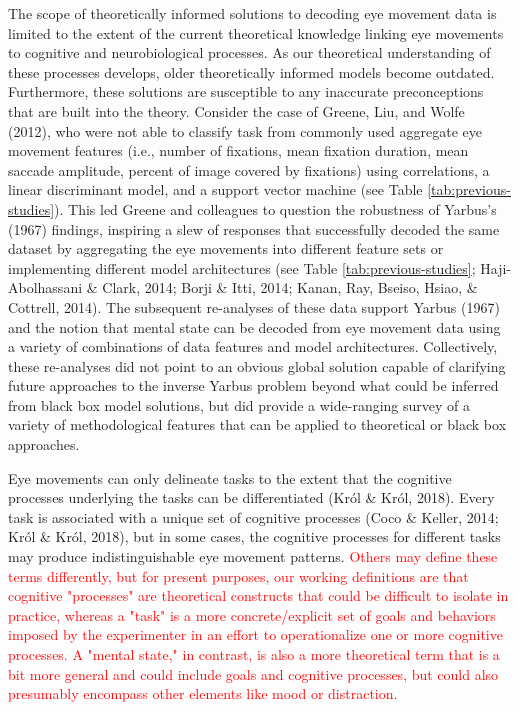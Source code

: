 \documentclass[
  english,
  man, donotrepeattitle,floatsintext]{apa6}
\begin{document}
The scope of theoretically informed solutions to decoding eye movement data is limited to the extent of the current theoretical knowledge linking eye movements to cognitive and neurobiological processes. As our theoretical understanding of these processes develops, older theoretically informed models become outdated. Furthermore, these solutions are susceptible to any inaccurate preconceptions that are built into the theory. Consider the case of Greene, Liu, and Wolfe (2012), who were not able to classify task from commonly used aggregate eye movement features (i.e., number of fixations, mean fixation duration, mean saccade amplitude, percent of image covered by fixations) using correlations, a linear discriminant model, and a support vector machine (see Table \ref{tab:previous-studies}). This led Greene and colleagues to question the robustness of Yarbus's (1967) findings, inspiring a slew of responses that successfully decoded the same dataset by aggregating the eye movements into different feature sets or implementing different model architectures (see Table \ref{tab:previous-studies}; Haji-Abolhassani \& Clark, 2014; Borji \& Itti, 2014; Kanan, Ray, Bseiso, Hsiao, \& Cottrell, 2014). The subsequent re-analyses of these data support Yarbus (1967) and the notion that mental state can be decoded from eye movement data using a variety of combinations of data features and model architectures. Collectively, these re-analyses did not point to an obvious global solution capable of clarifying future approaches to the inverse Yarbus problem beyond what could be inferred from black box model solutions, but did provide a wide-ranging survey of a variety of methodological features that can be applied to theoretical or black box approaches.

Eye movements can only delineate tasks to the extent that the cognitive processes underlying the tasks can be differentiated (Król \& Król, 2018). Every task is associated with a unique set of cognitive processes (Coco \& Keller, 2014; Król \& Król, 2018), but in some cases, the cognitive processes for different tasks may produce indistinguishable eye movement patterns. \textcolor{red}{Others may define these terms differently, but for present purposes, our working definitions are that cognitive "processes" are theoretical constructs that could be difficult to isolate in practice, whereas a "task" is a more concrete/explicit set of goals and behaviors imposed by the experimenter in an effort to operationalize one or more cognitive processes. A "mental state," in contrast, is also a more theoretical term that is a bit more general and could include goals and cognitive processes, but could also presumably encompass other elements like mood or distraction.}
\end{document}
